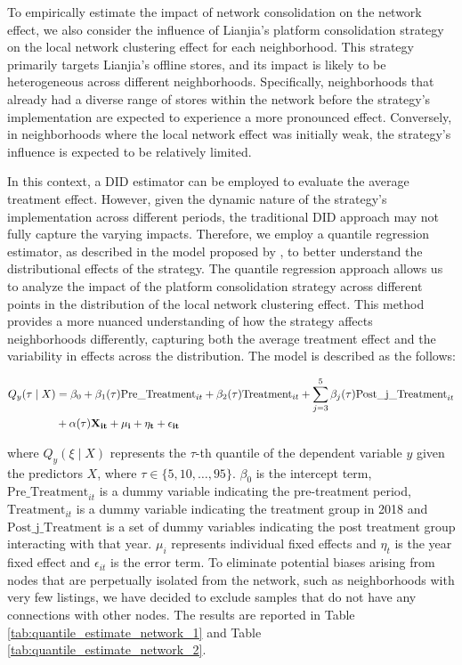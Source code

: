 \documentclass[11pt]{article}
\begin{document}
To empirically estimate the impact of network consolidation on the network effect, we also consider the influence of Lianjia's platform consolidation strategy on the local network clustering effect for each neighborhood. This strategy primarily targets Lianjia's offline stores, and its impact is likely to be heterogeneous across different neighborhoods. Specifically, neighborhoods that already had a diverse range of stores within the network before the strategy's implementation are expected to experience a more pronounced effect. Conversely, in neighborhoods where the local network effect was initially weak, the strategy's influence is expected to be relatively limited. 

In this context, a DID estimator can be employed to evaluate the average treatment effect. However, given the dynamic nature of the strategy's implementation across different periods, the traditional DID approach may not fully capture the varying impacts. Therefore, we employ a quantile regression estimator, as described in the model proposed by \citep{machado_quantiles_2019}, to better understand the distributional effects of the strategy. The quantile regression approach allows us to analyze the impact of the platform consolidation strategy across different points in the distribution of the local network clustering effect. This method provides a more nuanced understanding of how the strategy affects neighborhoods differently, capturing both the average treatment effect and the variability in effects across the distribution. The model is described as the follows:

\begin{equation}
  \begin{aligned}
    Q_y(\tau \mid X) & = \beta_0 + \beta_1(\tau) \text{Pre\_Treatment}_{it} + \beta_2(\tau) \text{Treatment}_{it} + \sum_{j=3}^5 \beta_j(\tau) \text{Post\_j\_Treatment}_{it} \\
                     & + \alpha(\tau) \bf{X}_{it} + \mu_i + \eta_t + \epsilon_{it}
  \end{aligned}
\end{equation}

where $Q_y(\xi \mid X)$ represents the $\tau$-th quantile of the dependent variable $y$ given the predictors $X$, where $\tau \in \{5, 10, \ldots, 95\}$. $\beta_0$ is the intercept term, $\text{Pre\_Treatment}_{it}$ is a dummy variable indicating the pre-treatment period, $\text{Treatment}_{it}$ is a dummy variable indicating the treatment group in 2018 and $\text{Post\_j\_Treatment}$ is a set of dummy variables indicating the post treatment group interacting with that year. $\mu_i$ represents individual fixed effects and $\eta_t$ is the year fixed effect and $\epsilon_{it}$ is the error term. To eliminate potential biases arising from nodes that are perpetually isolated from the network, such as neighborhoods with very few listings, we have decided to exclude samples that do not have any connections with other nodes. The results are reported in Table \ref{tab:quantile_estimate_network_1} and Table \ref{tab:quantile_estimate_network_2}. 
\end{document}
